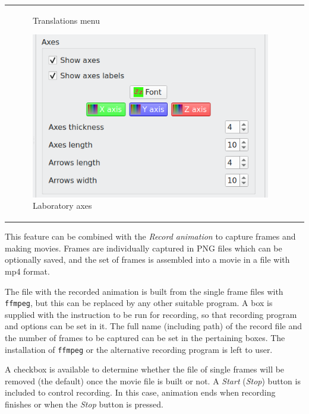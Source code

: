 \documentclass[10pt]{article}
\begin{document}
\begin{center}
\begin{tabular}{lr}
\begin{minipage}{.35\linewidth}
\begin{figure}[H]
\begin{center}
        \end{center}
        \vspace*{-1mm}
        \caption{Translations menu \label{fig:4_4_1}}
    \end{figure}
    \begin{figure}[H]
        \begin{center}
            \vspace*{-3mm}
            \includegraphics[width=0.6\linewidth]{damqt320_lab_axes.png}
        \end{center}
        \vspace*{-1mm}
        \caption{Laboratory axes \label{fig:4_5_1}}
    \end{figure}
\end{minipage}
\end{tabular}
\end{center}


This feature can be 
combined with the {\it Record animation} 
to capture frames and making movies. 
Frames are individually captured in PNG files which can be optionally saved, and the set of frames 
is assembled into a movie in a file with mp4 format.

The file with the recorded animation is built from the single frame files with \texttt{ffmpeg}, 
but this can be replaced by any other
suitable program. A box is supplied with the instruction to be run for recording, so that 
recording program and options can be set in it. The full name (including path) of the record
file and the number of frames to be captured can be set in the pertaining boxes.
The installation of \texttt{ffmpeg} or the alternative recording program is left to user.

A checkbox is available to determine whether the file of single frames will be 
removed (the default) once the movie file is built or not.
A {\it Start} ({\it Stop}) button is included to control recording. In this case, 
animation ends when recording finishes or when the {\it Stop} button is pressed.
\end{document}
